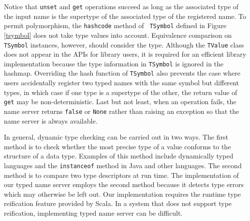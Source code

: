 Notice that {\tt unset} and {\tt get} operations succeed as long as the 
associated type of the input name is the supertype of the associated type of 
the registered name.  To permit polymorphism, the {\tt hashcode} method of {\tt 
TSymbol} defined in  Figure {\ref{tsymbol}} does not take type values into 
account.  Equivalence comparison on {\tt TSymbol} instances, however, should 
consider the type.  Although the {\tt TValue} class does not appear in the
APIs for library users, it is required for an efficient library implementation 
because the type 
information in {\tt TSymbol} is ignored in the hashmap.  Overriding the
hash function of {\tt TSymbol} also prevents the case where users accidentally
register two typed names with the same symbol but different types,
in which case if one type is a supertype of the other, the return value of
{\tt get} may be non-deterministic.  Last but not least, when an operation 
fails, the name server returns {\tt false} or {\tt None} rather than raising an
exception so that the name server is always available.

In general, dynamic type checking can be carried out in two ways.  The first 
method is to check whether the most precise type of a value conforms to the
structure of a data type.  Examples of this method include dynamically typed
languages and the {\tt instanceof} method in Java and other languages.  The
second method is to compare two type descriptors at run time.  The
implementation of our typed name server employs the second method because  
it detects type errors which may otherwise be left out.  Our
implementation requires the runtime type reification feature provided by Scala.
In a system that does not support type reification, implementing typed name 
server can be difficult.


